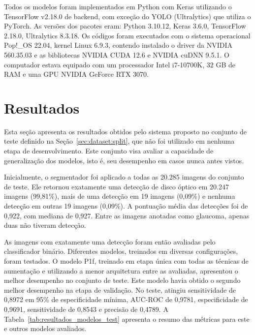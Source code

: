 \documentclass[12pt]{article}
\begin{document}
Todos os modelos foram implementados em Python com Keras utilizando o TensorFlow v2.18.0 de backend, com exceção do YOLO (Ultralytics) que utiliza o PyTorch. As versões dos pacotes eram: Python 3.10.12, Keras 3.6.0, TensorFlow 2.18.0, Ultralytics 8.3.18.
Os códigos foram executados com o sistema operacional Pop!\_OS 22.04, kernel Linux 6.9.3, contendo instalado o driver da NVIDIA 560.35.03 e as bibliotecas NVIDIA CUDA 12.6 e NVIDIA cuDNN 9.5.1.
O computador estava equipado com um processador Intel i7-10700K, 32 GB de RAM e uma GPU NVIDIA GeForce RTX 3070.

\section{Resultados}
\label{sec:results}

Esta seção apresenta os resultados obtidos pelo sistema proposto no conjunto de teste definido na Seção~\ref{sec:dataset:split}, que não foi utilizado em nenhuma etapa de desenvolvimento. Este conjunto visa avaliar a capacidade de generalização dos modelos, isto é, seu desempenho em casos nunca antes vistos.

%

Inicialmente, o segmentador foi aplicado a todas as 20.285 imagens do conjunto de teste. Ele retornou exatamente uma detecção de disco óptico em 20.247 imagens (99,81\%), mais de uma detecção em 19 imagens (0,09\%) e nenhuma detecção em outras 19 imagens (0,09\%). A pontuação média das detecções foi de 0,922, com mediana de 0,927. Entre as imagens anotadas como glaucoma, apenas duas não tiveram detecção.

As imagens com exatamente uma detecção foram então avaliadas pelo classificador binário. Diferentes modelos, treinados em diversas configurações, foram testados. O modelo P1f, treinado em etapa única com todas as técnicas de aumentação e utilizando a menor arquitetura entre as avaliadas, apresentou o melhor desempenho no conjunto de teste. Este modelo havia obtido o segundo melhor desempenho na etapa de validação. No teste, atingiu sensitividade de 0,8972 em 95\% de especificidade mínima, AUC-ROC de 0,9781, especificidade de 0,9691, sensitividade de 0,8543 e precisão de 0,4789. A Tabela~\ref{tab:resultados_modelos_test} apresenta o resumo das métricas para este e outros modelos avaliados.
\end{document}
